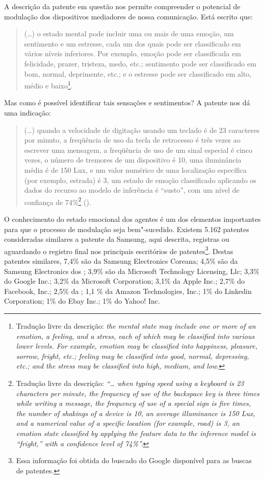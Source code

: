 A descrição da patente em questão nos permite compreender o potencial de
modulação dos dispositivos mediadores de nossa comunicação. Está escrito
que:

\begin{quote}
(\ldots{}) o estado mental pode incluir uma ou mais de uma emoção, um
sentimento e um estresse, cada um dos quais pode ser classificado em
vários níveis inferiores. Por exemplo, emoção pode ser classificada em
felicidade, prazer, tristeza, medo, etc.; sentimento pode ser
classificado em bom, normal, deprimente, etc.; e o estresse pode ser
classificado em alto, médio e baixo\footnote{Tradução livre da
  descrição: \emph{the mental state may include one or more of an emotion, a
    feeling, and a stress, each of which may be classified into various
    lower levels. For example, emotion may be classified into happiness,
    pleasure, sorrow, fright, etc.; feeling may be classified into good,
    normal, depressing, etc.; and the stress may be classified into high,
    medium, and low}.}.
\end{quote}

Mas como é possível identificar tais sensações e sentimentos? A patente
nos dá uma indicação:

\begin{quote}
(\ldots{}) quando a velocidade de digitação usando um teclado é de 23
caracteres por minuto, a freqüência de uso da tecla de retrocesso é três
vezes ao escrever uma mensagem, a freqüência de uso de um sinal especial
é cinco vezes, o número de tremores de um dispositivo é 10, uma
iluminância média é de 150 Lux, e um valor numérico de uma localização
específica (por exemplo, estrada) é 3, um estado de emoção classificado
aplicando os dados do recurso ao modelo de inferência é ``susto'', com
um nível de confiança de 74\%\footnote{Tradução livre da descrição:
  \emph{``\ldots{} when typing speed using a keyboard is 23 characters per
    minute, the frequency of use of the backspace key is three times while
    writing a message, the frequency of use of a special sign is five
    times, the number of shakings of a device is 10, an average
    illuminance is 150 Lux, and a numerical value of a specific location
    (for example, road) is 3, an emotion state classified by applying the
    feature data to the inference model is ``fright,'' with a confidence
    level of 74\%''.}} ().
\end{quote}

O conhecimento do estado emocional dos agentes é um dos elementos
importantes para que o processo de modulação seja bem"-sucedido. Existem
5.162 patentes consideradas similares a patente da Samsung, aqui
descrita, registras ou aguardando o registro final nos principais
escritórios de patentes\footnote{Essa informação foi obtida do buscado
  do Google disponível para as buscas de patentes.}. Destas patentes
similares, 7,4\% são da Samsung Electronics Coreana; 4,5\% são da
Samsung Electronics dos ; 3,9\% são da Microsoft Technology
Licensing, Llc; 3,3\% do Google Inc.; 3,2\% da Microsoft Corporation;
3,1\% da Apple Inc.; 2,7\% do Facebook, Inc.; 2,5\% da ; 1,1 \% da
Amazon Technologies, Inc.; 1\% do Linkedin Corporation; 1\% do Ebay
Inc.; 1\% do Yahoo! Inc.

